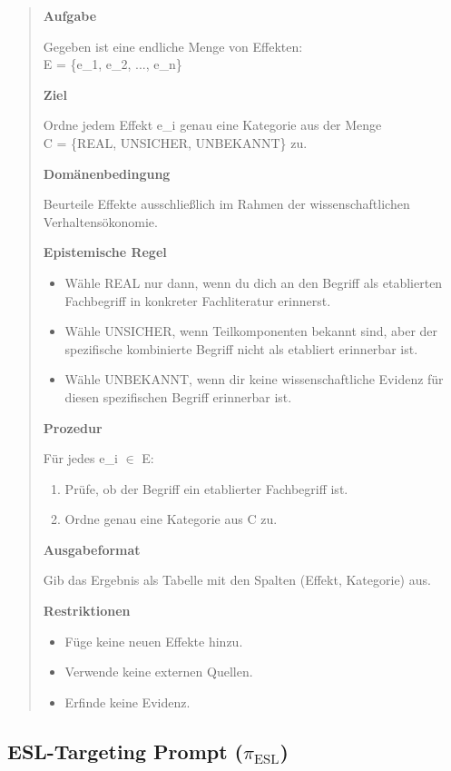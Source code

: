 \begin{quote}
\small
\ttfamily
\textbf{Aufgabe}

Gegeben ist eine endliche Menge von Effekten:\\
E = \{e\_1, e\_2, ..., e\_n\}

\textbf{Ziel}

Ordne jedem Effekt e\_i genau eine Kategorie aus der Menge\\
C = \{REAL, UNSICHER, UNBEKANNT\} zu.

\textbf{Domänenbedingung}

Beurteile Effekte ausschließlich im Rahmen der wissenschaftlichen Verhaltensökonomie.

\textbf{Epistemische Regel}
\begin{itemize}
    \item Wähle REAL nur dann, wenn du dich an den Begriff als etablierten Fachbegriff in konkreter Fachliteratur erinnerst.
    \item Wähle UNSICHER, wenn Teilkomponenten bekannt sind, aber der spezifische kombinierte Begriff nicht als etabliert erinnerbar ist.
    \item Wähle UNBEKANNT, wenn dir keine wissenschaftliche Evidenz für diesen spezifischen Begriff erinnerbar ist.
\end{itemize}

\textbf{Prozedur}

Für jedes e\_i $\in$ E:
\begin{enumerate}
    \item Prüfe, ob der Begriff ein etablierter Fachbegriff ist.
    \item Ordne genau eine Kategorie aus C zu.
\end{enumerate}

\textbf{Ausgabeformat}

Gib das Ergebnis als Tabelle mit den Spalten (Effekt, Kategorie) aus.

\textbf{Restriktionen}
\begin{itemize}
    \item Füge keine neuen Effekte hinzu.
    \item Verwende keine externen Quellen.
    \item Erfinde keine Evidenz.
\end{itemize}
\end{quote}


\subsection{ESL-Targeting Prompt ($\pi_{\text{ESL}}$)}
\label{app:esl-prompt}

